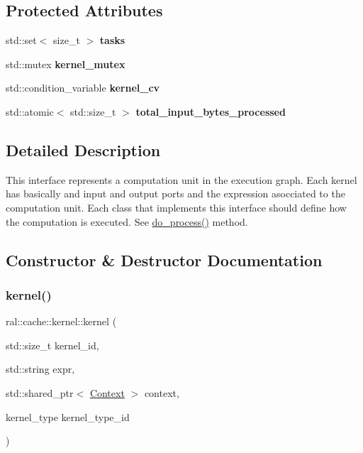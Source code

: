 \subsection*{Protected Attributes}
\begin{DoxyCompactItemize}
\item 
\mbox{\label{classral_1_1cache_1_1kernel_a24ef14f94bf23f483736043ca6f95b7e}} 
std\+::set$<$ size\+\_\+t $>$ {\bfseries tasks}
\item 
\mbox{\label{classral_1_1cache_1_1kernel_a8e336a4bc07932d5fc243409324cdcc1}} 
std\+::mutex {\bfseries kernel\+\_\+mutex}
\item 
\mbox{\label{classral_1_1cache_1_1kernel_af711082b1f602bacc21d679d318648f7}} 
std\+::condition\+\_\+variable {\bfseries kernel\+\_\+cv}
\item 
\mbox{\label{classral_1_1cache_1_1kernel_a57a0078f5ab3991b32e9ea92989eab42}} 
std\+::atomic$<$ std\+::size\+\_\+t $>$ {\bfseries total\+\_\+input\+\_\+bytes\+\_\+processed}
\end{DoxyCompactItemize}


\subsection{Detailed Description}
This interface represents a computation unit in the execution graph. Each kernel has basically and input and output ports and the expression asocciated to the computation unit. Each class that implements this interface should define how the computation is executed. See {\ttfamily \hyperlink{classral_1_1cache_1_1kernel_aa8d19c5f112f8965ea2f9999fb5fd625}{do\+\_\+process()}} method. 

\subsection{Constructor \& Destructor Documentation}
\mbox{\label{classral_1_1cache_1_1kernel_a533e4ae37fc18a6c8638f30ee8459d8f}} 
\subsubsection{\texorpdfstring{kernel()}{kernel()}}
{\footnotesize\ttfamily ral\+::cache\+::kernel\+::kernel (\begin{DoxyParamCaption}\item[{std\+::size\+\_\+t}]{kernel\+\_\+id,  }\item[{std\+::string}]{expr,  }\item[{std\+::shared\+\_\+ptr$<$ \hyperlink{classblazingdb_1_1manager_1_1Context}{Context} $>$}]{context,  }\item[{kernel\+\_\+type}]{kernel\+\_\+type\+\_\+id }\end{DoxyParamCaption})}

